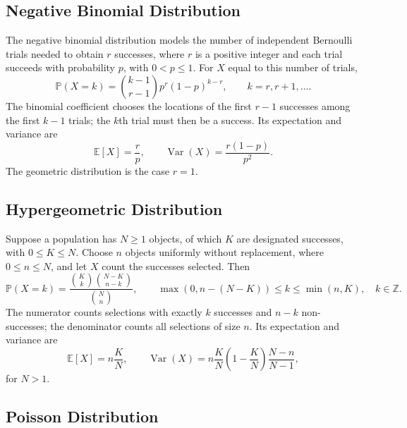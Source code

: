 \documentclass[a4paper,11pt,abstracton]{scrartcl}
\theoremstyle{dotlessP}
\theoremstyle{dotlessS}
\theoremstyle{remark}
\theoremstyle{definition}
\begin{document}
\subsection{Negative Binomial Distribution}

The negative binomial distribution models the number of independent Bernoulli trials needed to obtain $r$ successes, where $r$ is a positive integer and each trial succeeds with probability $p$, with $0<p\leq1$. For $X$ equal to this number of trials,
\[
  \mathbb{P}(X=k)=\binom{k-1}{r-1}p^r(1-p)^{k-r},
  \qquad k=r,r+1,\ldots.
\]
The binomial coefficient chooses the locations of the first $r-1$ successes among the first $k-1$ trials; the $k$th trial must then be a success. Its expectation and variance are
\[
  \mathbb{E}[X]=\frac{r}{p},\qquad
  \operatorname{Var}(X)=\frac{r(1-p)}{p^2}.
\]
The geometric distribution is the case $r=1$.

\subsection{Hypergeometric Distribution}

Suppose a population has $N\geq1$ objects, of which $K$ are designated successes, with $0\leq K\leq N$. Choose $n$ objects uniformly without replacement, where $0\leq n\leq N$, and let $X$ count the successes selected. Then
\[
  \mathbb{P}(X=k)
  =\frac{\binom{K}{k}\binom{N-K}{n-k}}{\binom{N}{n}},
  \qquad \max(0,n-(N-K))\leq k\leq\min(n,K),\quad k\in\mathbb{Z}.
\]
The numerator counts selections with exactly $k$ successes and $n-k$ non-successes; the denominator counts all selections of size $n$. Its expectation and variance are
\[
  \mathbb{E}[X]=n\frac{K}{N},\qquad
  \operatorname{Var}(X)=n\frac{K}{N}\left(1-\frac{K}{N}\right)\frac{N-n}{N-1},
\]
for $N>1$.

\subsection{Poisson Distribution}
\end{document}
